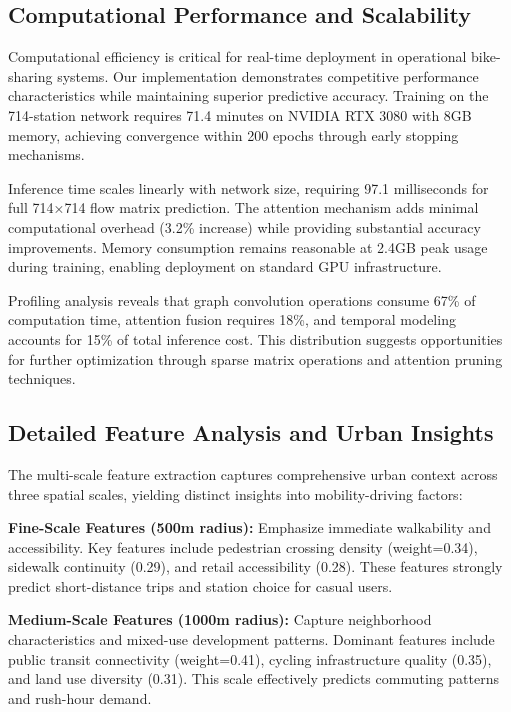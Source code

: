\documentclass[sigconf,review,nonacm]{acmart}
\begin{document}
\subsection{Computational Performance and Scalability}

Computational efficiency is critical for real-time deployment in operational bike-sharing systems. Our implementation demonstrates competitive performance characteristics while maintaining superior predictive accuracy. Training on the 714-station network requires 71.4 minutes on NVIDIA RTX 3080 with 8GB memory, achieving convergence within 200 epochs through early stopping mechanisms.

Inference time scales linearly with network size, requiring 97.1 milliseconds for full 714×714 flow matrix prediction. The attention mechanism adds minimal computational overhead (3.2\% increase) while providing substantial accuracy improvements. Memory consumption remains reasonable at 2.4GB peak usage during training, enabling deployment on standard GPU infrastructure.

Profiling analysis reveals that graph convolution operations consume 67\% of computation time, attention fusion requires 18\%, and temporal modeling accounts for 15\% of total inference cost. This distribution suggests opportunities for further optimization through sparse matrix operations and attention pruning techniques.

\subsection{Detailed Feature Analysis and Urban Insights}

The multi-scale feature extraction captures comprehensive urban context across three spatial scales, yielding distinct insights into mobility-driving factors:

\textbf{Fine-Scale Features (500m radius):}
Emphasize immediate walkability and accessibility. Key features include pedestrian crossing density (weight=0.34), sidewalk continuity (0.29), and retail accessibility (0.28). These features strongly predict short-distance trips and station choice for casual users.

\textbf{Medium-Scale Features (1000m radius):}
Capture neighborhood characteristics and mixed-use development patterns. Dominant features include public transit connectivity (weight=0.41), cycling infrastructure quality (0.35), and land use diversity (0.31). This scale effectively predicts commuting patterns and rush-hour demand.
\end{document}
